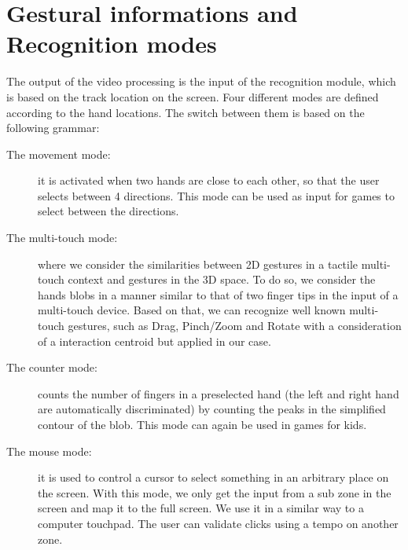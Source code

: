 \documentclass{llncs}
\begin{document}
\section{Gestural informations and Recognition modes}
The output of the video processing is the input of the recognition module,
which is based on the track location on the screen.
Four different modes are defined according to the hand locations. The switch between them is based on the following grammar:
\begin{description}
 \item[The movement mode:] it is activated when two hands are close to each other, so that the user selects between 4 directions. This mode can be used as input for games to select between the directions.
 \item[The multi-touch mode:] where we consider the similarities between 2D gestures in a tactile multi-touch context and gestures in the 3D space. To do so, we consider the hands blobs in a manner similar to that of two finger tips in the input of a multi-touch device. Based on that, we can recognize well known multi-touch gestures, such as Drag, Pinch/Zoom and Rotate with a consideration of a interaction centroid\cite{CentroidGest} but applied in our case.
 \item[The counter mode:] counts the number of fingers in a preselected hand (the left and right hand are automatically discriminated) by counting the peaks in the simplified contour of the blob. This mode can again be used in games for kids.
 \item[The mouse mode:] it is used to control a cursor to select something in an arbitrary place on the screen. With this mode, we only get the input from a sub zone in the screen and map it to the full screen. We use it in a similar way to a computer touchpad.
The user can validate clicks using a tempo on another zone.
\end{description}


\end{document}
